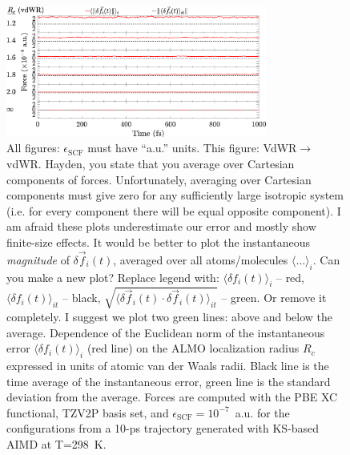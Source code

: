 \documentclass[aps,prl,reprint,amsmath,amssymb]{revtex4-1}
\begin{document}
\begin{figure}[t]
\includegraphics[trim={0.1cm 0cm 0.2cm 0.1cm},clip,width=8.6cm]{DeltaForceComparison_ALMO_SCF.eps}
\caption{\label{fig:forcecomp} {\color{red} All figures: $\epsilon_{\text{SCF}}$ must have ``a.u.'' units. This figure: VdWR$\rightarrow$vdWR. Hayden, you state that you average over Cartesian components of forces. Unfortunately, averaging over Cartesian components must give zero for any sufficiently large isotropic system (i.e. for every component there will be equal  opposite component). I am afraid these plots underestimate our error and mostly show finite-size effects. It would be better to plot the instantaneous \emph{magnitude} of $\delta \vec{f}_i(t)$, averaged over all atoms/molecules $\langle \ldots \rangle_i$. Can you make a new plot? Replace legend with: $\langle \delta f_i(t) \rangle_i$ -- red, $\langle \delta f_i(t) \rangle_{it}$ -- black, $\sqrt{\langle \delta \vec{f}_i(t) \cdot \delta \vec{f}_i(t) \rangle_{it}}$ -- green. Or remove it completely. I suggest we plot two green lines: above and below the average.} Dependence of the Euclidean norm of the instantaneous error $\langle \delta f_i(t) \rangle_i$ (red line) on the ALMO localization radius $R_c$ expressed in units of atomic van der Waals radii. Black line is the time average of the instantaneous error, green line is the standard deviation from the average. %
Forces are computed with the PBE XC functional, TZV2P basis set, and $\epsilon_{\text{SCF}} = 10^{-7}$~a.u. for the configurations from a 10-ps trajectory generated with KS-based AIMD at T=298~K.}
\end{figure}

\end{document}
